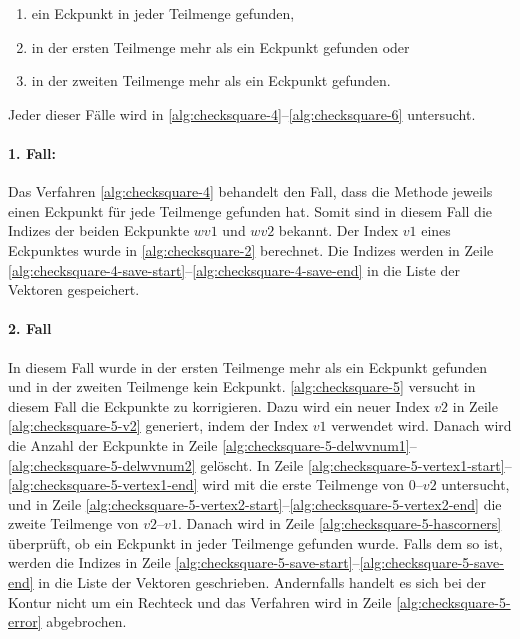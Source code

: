 \begin{enumerate}
	\item ein Eckpunkt in jeder Teilmenge gefunden, \label{enum:checksquare-case1}
	\item in der ersten Teilmenge mehr als ein Eckpunkt gefunden oder \label{enum:checksquare-case2}
	\item in der zweiten Teilmenge mehr als ein Eckpunkt gefunden. \label{enum:checksquare-case3}
\end{enumerate}

Jeder dieser Fälle wird in \autoref{alg:checksquare-4}--\autoref{alg:checksquare-6} untersucht.

\paragraph{1. Fall:} %
\label{par:1_fall}

Das Verfahren \autoref{alg:checksquare-4} behandelt den Fall, dass die Methode  jeweils einen
 Eckpunkt für jede Teilmenge gefunden hat. Somit sind in diesem Fall die Indizes der beiden Eckpunkte $\mathit{wv1}$
 und $\mathit{wv2}$ bekannt. Der Index $\mathit{v1}$ eines Eckpunktes wurde in \autoref{alg:checksquare-2} berechnet.
 Die Indizes werden in Zeile \ref{alg:checksquare-4-save-start}--\ref{alg:checksquare-4-save-end} in die Liste der
 Vektoren gespeichert.




\paragraph{2. Fall} %
\label{par:2_fall}

In diesem Fall wurde in der ersten Teilmenge mehr als ein Eckpunkt gefunden und in der zweiten Teilmenge kein Eckpunkt.
 \autoref{alg:checksquare-5} versucht in diesem Fall die Eckpunkte zu korrigieren. Dazu wird ein neuer Index
 $\mathit{v2}$ in Zeile \ref{alg:checksquare-5-v2} generiert, indem der Index $\mathit{v1}$ verwendet wird. Danach wird
 die Anzahl der Eckpunkte in Zeile \ref{alg:checksquare-5-delwvnum1}--\ref{alg:checksquare-5-delwvnum2} gelöscht. In
 Zeile \ref{alg:checksquare-5-vertex1-start}--\ref{alg:checksquare-5-vertex1-end} wird mit  die
 erste Teilmenge von $0$--$\mathit{v2}$ untersucht, und in Zeile
 \ref{alg:checksquare-5-vertex2-start}--\ref{alg:checksquare-5-vertex2-end} die zweite Teilmenge von
 $\mathit{v2}$--$\mathit{v1}$. Danach wird in Zeile \ref{alg:checksquare-5-hascorners} überprüft, ob ein Eckpunkt in
 jeder Teilmenge gefunden wurde. Falls dem so ist, werden die Indizes in Zeile
 \ref{alg:checksquare-5-save-start}--\ref{alg:checksquare-5-save-end} in die Liste der Vektoren geschrieben. Andernfalls
 handelt es sich bei der Kontur nicht um ein Rechteck und das Verfahren wird in Zeile \ref{alg:checksquare-5-error}
 abgebrochen.

